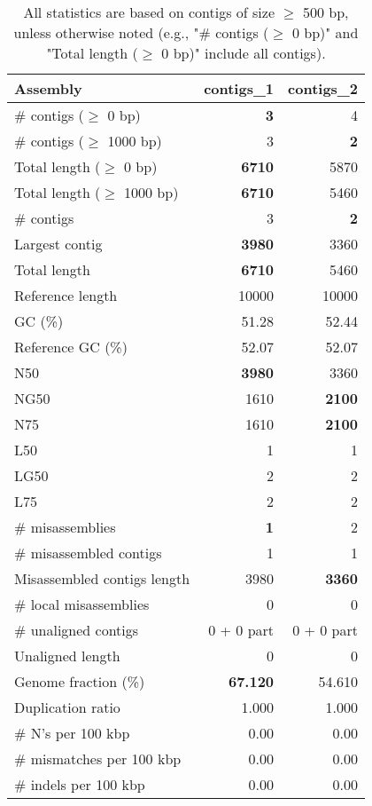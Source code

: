\documentclass[12pt,a4paper]{article}
\begin{document}
\begin{table}[ht]
\begin{center}
\caption{All statistics are based on contigs of size $\geq$ 500 bp, unless otherwise noted (e.g., "\# contigs ($\geq$ 0 bp)" and "Total length ($\geq$ 0 bp)" include all contigs).}
\begin{tabular}{|l*{2}{|r}|}
\hline
Assembly & contigs\_1 & contigs\_2 \\ \hline
\# contigs ($\geq$ 0 bp) & {\bf 3} & 4 \\ \hline
\# contigs ($\geq$ 1000 bp) & 3 & {\bf 2} \\ \hline
Total length ($\geq$ 0 bp) & {\bf 6710} & 5870 \\ \hline
Total length ($\geq$ 1000 bp) & {\bf 6710} & 5460 \\ \hline
\# contigs & 3 & {\bf 2} \\ \hline
Largest contig & {\bf 3980} & 3360 \\ \hline
Total length & {\bf 6710} & 5460 \\ \hline
Reference length & 10000 & 10000 \\ \hline
GC (\%) & 51.28 & 52.44 \\ \hline
Reference GC (\%) & 52.07 & 52.07 \\ \hline
N50 & {\bf 3980} & 3360 \\ \hline
NG50 & 1610 & {\bf 2100} \\ \hline
N75 & 1610 & {\bf 2100} \\ \hline
L50 & 1 & 1 \\ \hline
LG50 & 2 & 2 \\ \hline
L75 & 2 & 2 \\ \hline
\# misassemblies & {\bf 1} & 2 \\ \hline
\# misassembled contigs & 1 & 1 \\ \hline
Misassembled contigs length & 3980 & {\bf 3360} \\ \hline
\# local misassemblies & 0 & 0 \\ \hline
\# unaligned contigs & 0 + 0 part & 0 + 0 part \\ \hline
Unaligned length & 0 & 0 \\ \hline
Genome fraction (\%) & {\bf 67.120} & 54.610 \\ \hline
Duplication ratio & 1.000 & 1.000 \\ \hline
\# N's per 100 kbp & 0.00 & 0.00 \\ \hline
\# mismatches per 100 kbp & 0.00 & 0.00 \\ \hline
\# indels per 100 kbp & 0.00 & 0.00 \\ \hline

\end{tabular}
\end{center}
\end{table}
\end{document}
